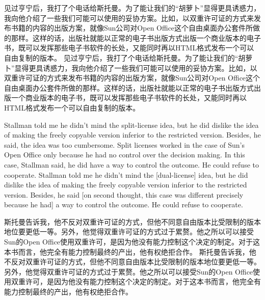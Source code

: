 \ifdefined\chs
\ifdefined\vone
见过亨宁后，我打了个电话给斯托曼。为了能让我们的``胡萝卜''显得更具诱惑力，我向他介绍了一些我们可能可以使用的妥协方案。比如，以双重许可证的方式来发布书籍的内容的出版方案，就像Sun公司对Open Office这个自由桌面办公套件所做的那样。这样的话，出版社就能以正常的电子书出版方式出版一个商业版本的电子书，既可以发挥那些电子书软件的长处，又能同时再以HTML格式发布一个可以自由复制的版本。
\fi
\ifdefined\vtwo
见过亨宁后，我打了个电话给斯托曼。为了能让我们的``胡萝卜''显得更具诱惑力，我向他介绍了一些我们可能可以使用的妥协方案。比如，以双重许可证的方式来发布书籍的内容的出版方案，就像Sun公司对Open Office这个自由桌面办公套件所做的那样。这样的话，出版社就能以正常的电子书出版方式出版一个商业版本的电子书，既可以发挥那些电子书软件的长处，又能同时再以HTML格式发布一个可以自由复制的版本。
\fi
\fi

\ifdefined\eng
\ifdefined\vone
Stallman told me he didn't mind the split-license idea, but he did dislike the idea of making the freely copyable version inferior to the restricted version. Besides, he said, the idea was too cumbersome. Split licenses worked in the case of Sun's Open Office only because he had no control over the decision making. In this case, Stallman said, he did have a way to control the outcome. He could refuse to cooperate.
\fi
\ifdefined\vtwo
Stallman told me he didn't mind the [dual-license] idea, but he did dislike the idea of making the freely copyable version inferior to the restricted version. Besides, he said [on second thought, this case was different precisely because he had] a way to control the outcome. He could refuse to cooperate.
\fi
\fi

\ifdefined\chs
\ifdefined\vone
斯托曼告诉我，他不反对双重许可证的方式，但他不同意自由版本比受限制的版本地位要更低一等。另外，他觉得双重许可证的方式过于累赘。他之所以可以接受Sun的Open Office使用双重许可，是因为他没有能力控制这个决定的制定。对于这本书而言，他完全有能力控制最终的产出，他有权绝拒合作。
\fi
\ifdefined\vtwo
斯托曼告诉我，他不反对双重许可证的方式，但他不同意自由版本比受限制的版本地位要更低一等。另外，他觉得双重许可证的方式过于累赘。他之所以可以接受Sun的Open Office使用双重许可，是因为他没有能力控制这个决定的制定。对于这本书而言，他完全有能力控制最终的产出，他有权绝拒合作。
\fi
\fi

\ifdefined\vtwo
\ifdefined{}
\fi

